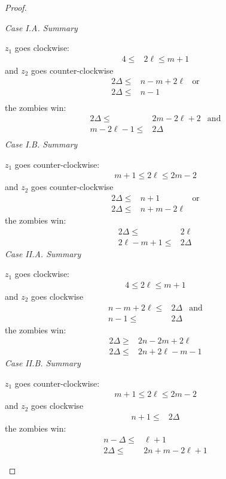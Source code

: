 \begin{proof}
\begin{description}
 \textit{Case I.A. Summary}

 $z_1$ goes clockwise:
 \begin{align*}
  4 \leq & 2 \ell \leq m + 1
 \end{align*}
 and $z_2$ goes counter-clockwise
 \begin{align*}
  2 \Delta \leq & n - m + 2\ell & \text{or} \\
  2 \Delta \leq & n - 1                     \\
 \end{align*}
 the zombies win:
 \begin{align*}
  2 \Delta \leq      & 2 m- 2 \ell + 2 & \text{and} \\
  m - 2\ell  -1 \leq & 2 \Delta                     \\
 \end{align*}
 \textit{Case I.B. Summary}

 $z_1$ goes counter-clockwise:
 \begin{align*}
  m + 1 \leq 2 \ell \leq 2m - 2
 \end{align*}
 and $z_2$ goes counter-clockwise
 \begin{align*}
  2 \Delta \leq & n + 1         & \text{or} \\
  2 \Delta \leq & n + m - 2\ell
 \end{align*}
 the zombies win:
 \begin{align*}
  2 \Delta \leq      & 2 \ell   \\
  2\ell - m + 1 \leq & 2 \Delta
 \end{align*}
 \textit{Case II.A. Summary}

 $z_1$ goes clockwise:
 \begin{align*}
  4 \leq 2 \ell \leq m + 1
 \end{align*}
 and $z_2$ goes clockwise
 \begin{align*}
  n -m + 2\ell \leq & 2 \Delta & \text{and} \\
  n-1 \leq          & 2 \Delta
 \end{align*}
 the zombies win:
 \begin{align*}
  2 \Delta \geq & 2n - 2m + 2\ell    \\
  2 \Delta \leq & 2n + 2\ell - m - 1
 \end{align*}
 \textit{Case II.B. Summary}

 $z_1$ goes counter-clockwise:
 \begin{align*}
  m + 1 \leq 2 \ell \leq 2m - 2
 \end{align*}
 and $z_2$ goes clockwise
 \begin{align*}
  n+1 \leq & 2 \Delta
 \end{align*}
 the zombies win:
 \begin{align*}
  n - \Delta \leq & \ell + 1           \\
  2 \Delta \leq   & 2n + m - 2\ell + 1
 \end{align*}


\end{description}
\end{proof}
